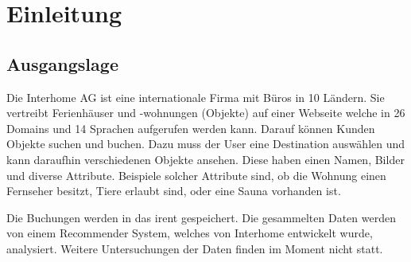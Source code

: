 
\chapter{Einleitung}
\label{sec:einleitung}
 
 


\section{Ausgangslage}
\label{sec:einleitung:ausgangslage}

Die Interhome AG ist eine internationale Firma mit Büros in 10 Ländern. Sie vertreibt Ferienhäuser und -wohnungen (Objekte) auf einer Webseite welche in 26 Domains und 14 Sprachen aufgerufen werden kann. Darauf können Kunden Objekte suchen und buchen. Dazu muss der User eine Destination auswählen und kann daraufhin verschiedenen Objekte ansehen. Diese haben einen Namen, Bilder und diverse Attribute. Beispiele solcher Attribute sind, ob die Wohnung einen Fernseher besitzt, Tiere erlaubt sind, oder eine Sauna vorhanden ist.

Die Buchungen werden in das \gls{irent} gespeichert. Die gesammelten Daten werden von einem Recommender System, welches von Interhome entwickelt wurde, analysiert. Weitere Untersuchungen der Daten finden im Moment nicht statt.

